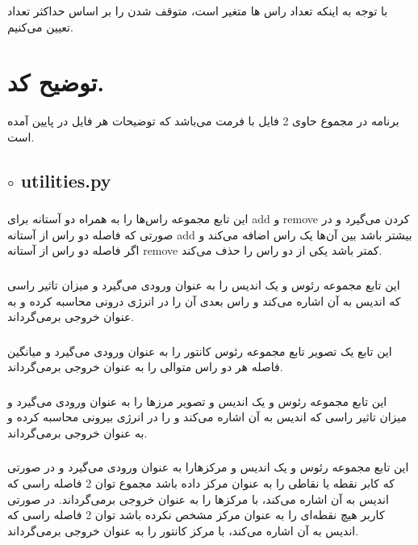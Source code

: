 \documentclass[a4paper,12pt]{article}
\begin{document}
با توجه به اینکه تعداد راس ها متغیر است، متوقف شدن را بر اساس حداکثر تعداد
تعیین می‌کنیم.
	\section*{توضیح کد.}
	برنامه در مجموع حاوی 2 فایل با فرمت
	می‌باشد که توضیحات هر فایل در پایین آمده است.
	\subsection*{$\circ$ utilities.py}
	\subsubsection*{}
	این تابع مجموعه راس‌ها را به همراه دو آستانه برای add و remove کردن می‌گیرد و در صورتی که فاصله دو راس از آستانه add بیشتر باشد بین آن‌ها یک راس اضافه می‌کند و اگر فاصله دو راس از آستانه remove کمتر باشد یکی از دو راس را حذف می‌کند.
	\subsubsection*{}
	این تابع مجموعه رئوس و یک اندیس را به عنوان ورودی می‌گیرد و میزان تاثیر راسی که اندیس به آن اشاره می‌کند و راس بعدی آن را در انرژی درونی محاسبه کرده و به عنوان خروجی برمی‌گرداند.
	\subsubsection*{}
	این تابع یک تصویر تابع مجموعه رئوس کانتور را به عنوان ورودی می‌گیرد و میانگین فاصله هر دو راس متوالی را به عنوان خروجی برمی‌گرداند.
	\subsubsection*{}
	این تابع مجموعه رئوس و یک اندیس و تصویر مرزها را به عنوان ورودی می‌گیرد و میزان تاثیر راسی که اندیس به آن اشاره می‌کند و را در انرژی بیرونی محاسبه کرده و به عنوان خروجی برمی‌گرداند.
	\subsubsection*{}
	این تابع مجموعه رئوس و یک اندیس و مرکزهارا به عنوان ورودی می‌گیرد و در صورتی که کابر نقطه یا نقاطی را به عنوان مرکز داده باشد مجموع توان 2 فاصله راسی که اندیس به آن اشاره می‌کند، با مرکزها را به عنوان خروجی برمی‌گرداند. در صورتی کاربر هیچ نقطه‌ای را به عنوان مرکز مشخص نکرده باشد توان 2 فاصله راسی که اندیس به آن اشاره می‌کند، با مرکز کانتور را به عنوان خروجی بر‌می‌گرداند.
\end{document}
